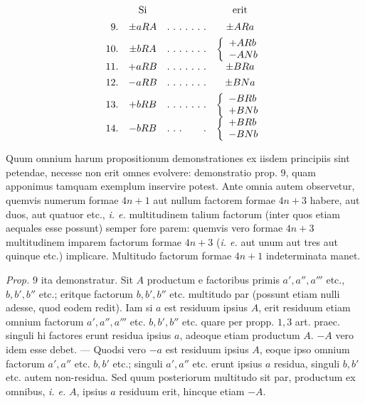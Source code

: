 \[
\begin{array}{rccc}&\text{Si}&&\text{erit}\\[5pt]
9.&\pm aRA&\mathinner{.\ .\ .\ .\ .\ .\ .}&\pm ARa\\[4pt]
10.&\pm bRA&\mathinner{.\ .\ .\ .\ .\ .\ .}&\left\{\begin{array}{l}+ARb\\-ANb\end{array}\right.\\[4pt]
11.&+aRB&\mathinner{.\ .\ .\ .\ .\ .\ .}&\pm BRa\\[4pt]
12.&-aRB&\mathinner{.\ .\ .\ .\ .\ .\ .}&\pm BNa\\[4pt]
13.&+bRB&\mathinner{.\ .\ .\ .\ .\ .\ .}&\left\{\begin{array}{l}-BRb\\+BNb\end{array}\right.\\[4pt]
14.&-bRB&\mathinner{.\ .\ .\ \phantom{.\ .\ .}\ .}&\left\{\begin{array}{l}+BRb\\-BNb\end{array}\right.\\[4pt]
\end{array}
\]

Quum omnium harum propositionum demonstrationes ex iisdem principiis sint petendae, necesse non erit omnes evolvere: demonstratio prop. $9$, quam apponimus tamquam exemplum inservire potest. Ante omnia autem observetur, quemvis numerum formae $4n+1$ aut nullum factorem formae $4n+3$ habere, aut duos, aut quatuor etc., \emph{i. e.} multitudinem talium factorum (inter quos etiam aequales esse possunt) semper fore parem: quemvis vero formae $4n+3$ multitudinem imparem factorum formae $4n+3$ (\emph{i. e.} aut unum aut tres aut quinque etc.) implicare. Multitudo factorum formae $4n+1$ indeterminata manet.

\emph{Prop.} $9$ ita demonstratur. Sit $A$ productum e factoribus primis $a',a'',a'''$ etc., $b,b',b''$ etc.; eritque factorum $b,b',b''$ etc. multitudo par (possunt etiam nulli adesse, quod eodem redit). Iam si $a$ est residuum ipsius $A$, erit residuum etiam omnium factorum $a',a'',a'''$ etc. $b,b',b''$ etc. quare per propp. $1,3$ art. praec. singuli hi factores erunt residua ipsius $a$, adeoque etiam productum $A$. $-A$ vero idem esse debet. --- Quodsi vero $-a$ est residuum ipsius $A$, eoque ipso omnium factorum $a',a''$ etc. $b,b'$ etc.; singuli $a',a''$ etc. erunt ipsius $a$ residua, singuli $b,b'$ etc. autem non-residua. Sed quum posteriorum multitudo sit par, productum ex omnibus, \emph{i. e.} $A$, ipsius $a$ residuum erit, hincque etiam $-A$.

